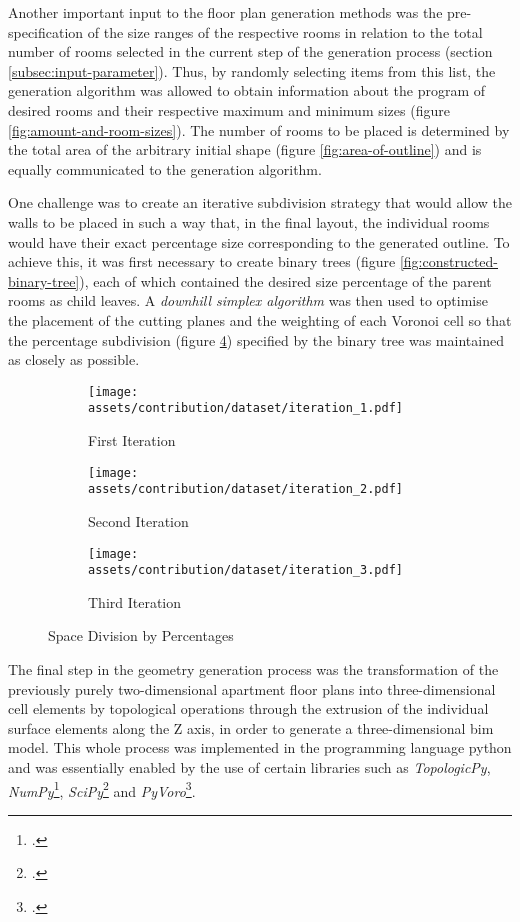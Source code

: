 \documentclass[a4paper, 12pt]{report}
\begin{document}
Another important input to the floor plan generation methods was the pre-specification of the size ranges of the respective rooms in relation to the total number of rooms selected in the current step of the generation process (section \ref{subsec:input-parameter}). Thus, by randomly selecting items from this list, the generation algorithm was allowed to obtain information about the program of desired rooms and their respective maximum and minimum sizes (figure \ref{fig:amount-and-room-sizes}). The number of rooms to be placed is determined by the total area of the arbitrary initial shape (figure \ref{fig:area-of-outline}) and is equally communicated to the generation algorithm.

One challenge was to create an iterative subdivision strategy that would allow the walls to be placed in such a way that, in the final layout, the individual rooms would have their exact percentage size corresponding to the generated outline. To achieve this, it was first necessary to create \glspl{binary tree} (figure \ref{fig:constructed-binary-tree}), each of which contained the desired size percentage of the parent rooms as child leaves. A \textit{\gls{downhill simplex algorithm}} was then used to optimise the placement of the cutting planes and the weighting of each Voronoi cell so that the percentage subdivision (figure \ref{fig:space-division-by-percentages}) specified by the \gls{binary tree} was maintained as closely as possible.

\begin{figure}
\centering
\begin{subfigure}{.33\textwidth}
\centering
\texttt{[image: assets/contribution/dataset/iteration\_1.pdf]}
\caption{First Iteration}
\label{fig:first-iteration-1}
\end{subfigure}%
\begin{subfigure}{.33\textwidth}
\centering
\texttt{[image: assets/contribution/dataset/iteration\_2.pdf]}
\caption{Second Iteration}
\label{fig:second-iteration-2}
\end{subfigure}%
\begin{subfigure}{.33\textwidth}
\centering
\texttt{[image: assets/contribution/dataset/iteration\_3.pdf]}
\caption{Third Iteration}
\label{fig:third-iteration}
\end{subfigure}
\caption{Space Division by Percentages}
\label{fig:space-division-by-percentages}
\end{figure}

The final step in the geometry generation process was the transformation of the previously purely two-dimensional apartment floor plans into three-dimensional cell elements by topological operations through the extrusion of the individual surface elements along the Z axis, in order to generate a three-dimensional \acrshort{bim} model. This whole process was implemented in the programming language \Gls{python} and was essentially enabled by the use of certain libraries such as \textit{TopologicPy}, \textit{NumPy}\footcite{2020NumPy-Array}, \textit{SciPy}\footcite{2020SciPy-NMeth} and \textit{PyVoro}\footcite{rycroft2007multiscale}.
\end{document}
